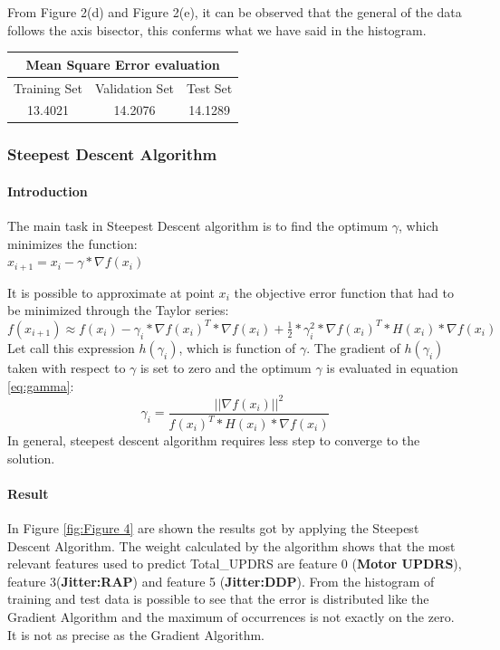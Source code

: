 \documentclass[12pt,a4paper,oneside]{article}
\begin{document}
	From Figure 2(d) and Figure 2(e), it can be observed that the general of the data follows the axis bisector, this conferms what we have said in the histogram.
	
	\begin{center}
		\begin{tabular}{ccc}	
			\toprule
			\multicolumn{3}{c}{\textbf{Mean Square Error evaluation}} \\ 
			\midrule 
			Training Set & Validation Set & Test Set \\ 
			\midrule
			 13.4021 & 14.2076 & 14.1289  \\ 
			\bottomrule
		\end{tabular} 
	\end{center}
	
	\subsubsection{Steepest Descent Algorithm}
	\paragraph{Introduction}
	The main task in Steepest Descent algorithm is to find the optimum $\gamma$, which minimizes the function:\\ 	$x_{i+1}=x_{i}-\gamma*\nabla f(x_{i})$
	
	It is possible to approximate at point $x_{i}$ the objective error function that had to be minimized through the Taylor series:\\
	$f(x_{i+1})\approx f(x_{i})-\gamma_{i}*\nabla f(x_{i})^{T}*\nabla f(x_{i})+\frac{1}{2}*\gamma_{i}^{2}*\nabla f(x_{i})^{T}*H(x_{i})*\nabla f(x_{i})$\\
	
	Let call this expression $h(\gamma_{i})$, which is function of $\gamma$. The gradient of $h(\gamma_{i})$ taken with respect to $\gamma$ is set to zero and the optimum $\gamma$ is evaluated in equation \eqref{eq:gamma}:
	\begin{equation}
	\label{eq:gamma}
		\gamma_{i}=\frac{||\nabla f(x_{i})||^{2}}{f(x_{i})^{T}*H(x_{i})*\nabla f(x_{i})}
	\end{equation}
	In general, steepest descent algorithm requires less step to converge to the solution.

	
	
	\paragraph{Result}
	In Figure \ref{fig:Figure 4} are shown the results got by applying the Steepest Descent Algorithm. The weight calculated by the algorithm shows that the most relevant features used to predict Total\_UPDRS are feature 0 (\textbf{Motor UPDRS}), feature 3(\textbf{Jitter:RAP}) and feature 5 (\textbf{Jitter:DDP}).
	From the histogram of training and test data is possible to see that the error is distributed like the Gradient Algorithm and the maximum of occurrences is not exactly on the zero. It is not as precise as the Gradient Algorithm.
	
\end{document}
